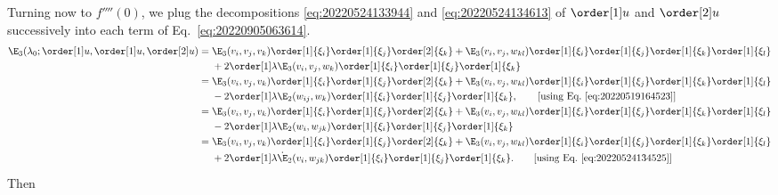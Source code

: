 Turning now to $f''''(0)$, we plug the decompositions \eqref{eq:20220524133944} and \eqref{eq:20220524134613} of
$\order[1]u$ and $\order[2]u$ successively into each term of Eq.~\eqref{eq:20220905063614}.
\begin{equation*}
  \begin{aligned}[b]
    \E_3(\lambda_0; \order[1]u, \order[1]u, \order[2]u)
    ={} & \E_3(v_i, v_j, v_k) \order[1]{\xi_i} \order[1]{\xi_j} \order[2]{\xi_k} + \E_3(v_i, v_j, w_{k l}) \order[1]{\xi_i} \order[1]{\xi_j} \order[1]{\xi_k} \order[1]{\xi_l}\\
    & + 2\order[1]\lambda \E_3(v_i, v_j, w_k) \order[1]{\xi_i} \order[1]{\xi_j} \order[1]{\xi_k} \\
    ={} & \E_3(v_i, v_j, v_k) \order[1]{\xi_i} \order[1]{\xi_j} \order[2]{\xi_k} + \E_3(v_i, v_j, w_{k l}) \order[1]{\xi_i} \order[1]{\xi_j} \order[1]{\xi_k} \order[1]{\xi_l}\\
    & - 2\order[1]\lambda \E_2(w_{ij}, w_k) \order[1]{\xi_i} \order[1]{\xi_j} \order[1]{\xi_k}, \qquad \text{[using Eq.~\eqref{eq:20220519164523}]}\\
    ={} & \E_3(v_i, v_j, v_k) \order[1]{\xi_i} \order[1]{\xi_j} \order[2]{\xi_k} + \E_3(v_i, v_j, w_{kl}) \order[1]{\xi_i} \order[1]{\xi_j} \order[1]{\xi_k} \order[1]{\xi_l}\\
    & - 2\order[1]\lambda \E_2(w_{i}, w_{jk}) \order[1]{\xi_i} \order[1]{\xi_j} \order[1]{\xi_k}\\
    ={} & \E_3(v_i, v_j, v_k) \order[1]{\xi_i} \order[1]{\xi_j} \order[2]{\xi_k} + \E_3(v_i, v_j, w_{kl}) \order[1]{\xi_i} \order[1]{\xi_j} \order[1]{\xi_k} \order[1]{\xi_l}\\
    & + 2 \order[1]\lambda \dot{\E}_2(v_{i}, w_{jk}) \order[1]{\xi_i} \order[1]{\xi_j} \order[1]{\xi_k}. \qquad \text{[using Eq.~\eqref{eq:20220524134525}]}
  \end{aligned}
\end{equation*}
Then
